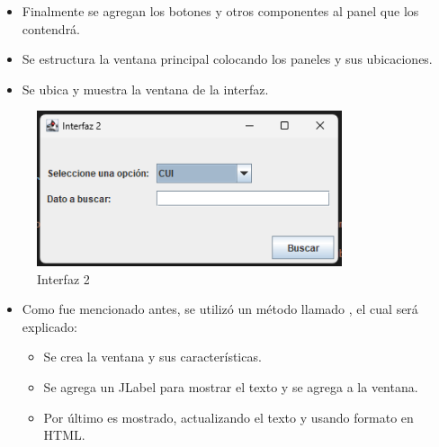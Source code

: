 \documentclass{article}
\begin{document}
    \begin{itemize}
        \begin{itemize}
            \item Finalmente se agregan los botones y otros componentes al panel que los contendrá.
            \item Se estructura la ventana principal colocando los paneles y sus ubicaciones.
            \item Se ubica y muestra la ventana de la interfaz.
        \end{itemize}
    \end{itemize}
    

     \begin{figure}[H]
        \centering
	\includegraphics[width=0.8\textwidth,keepaspectratio]{img/Interfaz2.png}
        \caption{Interfaz 2}
    \end{figure}


    \begin{itemize}
        \begin{itemize}
            \item Como fue mencionado antes, se utilizó un método llamado , el cual será explicado:
            \begin{itemize}
                \item Se crea la ventana y sus características.
                \item Se agrega un JLabel para mostrar el texto y se agrega a la ventana.
                \item Por último es mostrado, actualizando el texto y usando formato en HTML.
            \end{itemize}
        \end{itemize}
    \end{itemize}
    
\end{document}
